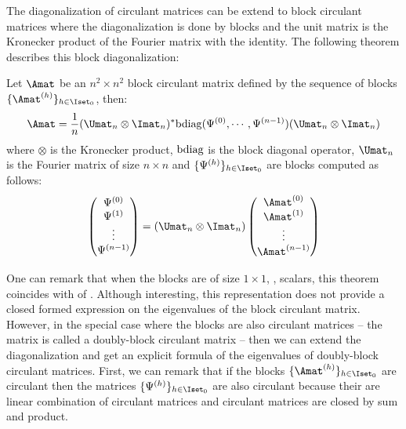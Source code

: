 \noindent
The diagonalization of circulant matrices can be extend to block circulant matrices where the diagonalization is done by blocks and the unit matrix is the Kronecker product of the Fourier matrix with the identity.
The following theorem describes this block diagonalization:
\begin{theorem}
  Let $\Amat$ be an $n^2 \times n^2$ block circulant matrix defined by the sequence of blocks $\{\Amat^{(h)}\}_{h \in \Iset_0}$, then:
  \begin{equation} \label{equation:ch2-block_diagonalization_block_circulant}
    \Amat = \frac{1}{n} (\Umat_n \otimes \Imat_n)^* \bdiag(\Psi^{(0)}, \cdots, \Psi^{(n-1)}) (\Umat_n \otimes \Imat_n)
  \end{equation}
  where $\otimes$ is the Kronecker product, $\mathrm{bdiag}$ is the block diagonal operator, $\Umat_n$ is the Fourier matrix of size $n \times n$ and $\{\Psi^{(h)}\}_{h \in \Iset_0}$ are blocks computed as follows:
  \begin{equation}
    \leftmatrix
      \Psi^{(0)} \\
      \Psi^{(1)} \\
      \vdots \\
      \Psi^{(n-1)} \\
    \rightmatrix = 
    (\Umat_n \otimes \Imat_n)
    \leftmatrix
      \Amat^{(0)} \\
      \Amat^{(1)} \\
      \vdots \\
      \Amat^{(n-1)} \\
    \rightmatrix
  \end{equation}
  \removespace
\end{theorem}
\noindent
One can remark that when the blocks are of size $1 \times 1$, \ie, scalars, this theorem coincides with  of .
Although interesting, this representation does not provide a closed formed expression on the eigenvalues of the block circulant matrix.
However, in the special case where the blocks are also circulant matrices -- the matrix is called a doubly-block circulant matrix -- then we can extend the diagonalization and get an explicit formula of the eigenvalues of doubly-block circulant matrices.
First, we can remark that if the blocks $\{\Amat^{(h)}\}_{h \in \Iset_0}$ are circulant then the matrices $\{\Psi^{(h)}\}_{h \in \Iset_0}$ are also circulant because their are linear combination of circulant matrices and circulant matrices are closed by sum and product. 
